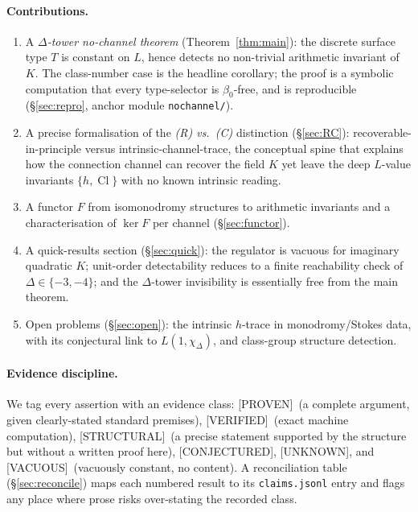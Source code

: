 \documentclass[11pt]{article}
\theoremstyle{definition}
\newcommand{\Cl}{\operatorname{Cl}}
\newcommand{\PROVEN}{\textsf{[PROVEN]}}
\newcommand{\VERIFIED}{\textsf{[VERIFIED]}}
\newcommand{\STRUCTURAL}{\textsf{[STRUCTURAL]}}
\newcommand{\CONJ}{\textsf{[CONJECTURED]}}
\newcommand{\UNK}{\textsf{[UNKNOWN]}}
\newcommand{\VAC}{\textsf{[VACUOUS]}}
\begin{document}
\paragraph{Contributions.}
\begin{enumerate}[leftmargin=2em]
\item A \emph{$\Delta$-tower no-channel theorem} (Theorem~\ref{thm:main}): the
discrete surface type $T$ is constant on $L$, hence detects no non-trivial arithmetic
invariant of $K$. The class-number case is the headline corollary; the proof is a
symbolic computation that every type-selector is $\beta_0$-free, and is reproducible
(\S\ref{sec:repro}, anchor module \texttt{nochannel/}).
\item A precise formalisation of the \emph{(R) vs.\ (C)} distinction
(\S\ref{sec:RC}): recoverable-in-principle versus intrinsic-channel-trace, the
conceptual spine that explains how the connection channel can recover the field $K$
yet leave the deep $L$-value invariants $\{h,\Cl\}$ with no known intrinsic reading.
\item A functor $F$ from isomonodromy structures to arithmetic invariants and a
characterisation of $\ker F$ per channel (\S\ref{sec:functor}).
\item A quick-results section (\S\ref{sec:quick}): the regulator is vacuous for
imaginary quadratic $K$; unit-order detectability reduces to a finite reachability
check of $\Delta\in\{-3,-4\}$; and the $\Delta$-tower invisibility is essentially
free from the main theorem.
\item Open problems (\S\ref{sec:open}): the intrinsic $h$-trace in monodromy/Stokes
data, with its conjectural link to $L(1,\chi_\Delta)$, and class-group structure
detection.
\end{enumerate}

\paragraph{Evidence discipline.} We tag every assertion with an evidence class:
\PROVEN\ (a complete argument, given clearly-stated standard premises),
\VERIFIED\ (exact machine computation), \STRUCTURAL\ (a precise statement supported
by the structure but without a written proof here), \CONJ, \UNK, and \VAC\ (vacuously
constant, no content). A reconciliation table (\S\ref{sec:reconcile}) maps each
numbered result to its \texttt{claims.jsonl} entry and flags any place where prose
risks over-stating the recorded class.

\end{document}
